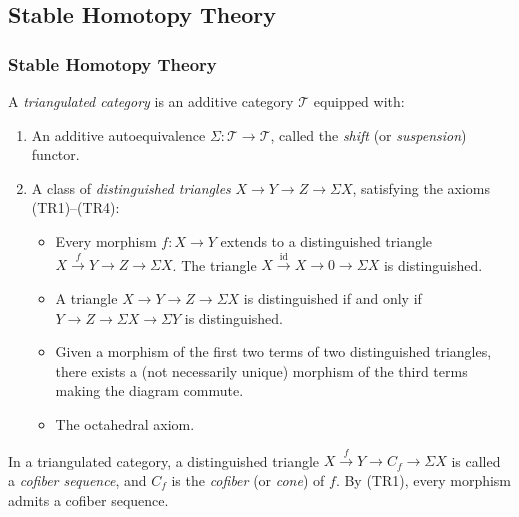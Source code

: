 \subsection{Stable Homotopy Theory}\label{sec:prereq-stable}

\subsubsection{Stable Homotopy Theory}\label{sec:prereq-stable-homotopy}

\begin{definition}\label{prereq:def:triangulated-category}
    \leanok
    A \emph{triangulated category} is an additive category $\mathcal{T}$ equipped with:
    \begin{enumerate}
        \item An additive autoequivalence $\Sigma: \mathcal{T} \to \mathcal{T}$, called the \emph{shift} (or \emph{suspension}) functor.
        \item A class of \emph{distinguished triangles} $X \to Y \to Z \to \Sigma X$, satisfying the axioms (TR1)--(TR4):
        \begin{itemize}
            \item[\textup{(TR1)}] Every morphism $f: X \to Y$ extends to a distinguished triangle $X \xrightarrow{f} Y \to Z \to \Sigma X$. The triangle $X \xrightarrow{\mathrm{id}} X \to 0 \to \Sigma X$ is distinguished.
            \item[\textup{(TR2)}] A triangle $X \to Y \to Z \to \Sigma X$ is distinguished if and only if $Y \to Z \to \Sigma X \to \Sigma Y$ is distinguished.
            \item[\textup{(TR3)}] Given a morphism of the first two terms of two distinguished triangles, there exists a (not necessarily unique) morphism of the third terms making the diagram commute.
            \item[\textup{(TR4)}] The octahedral axiom.
        \end{itemize}
    \end{enumerate}
\end{definition}

\begin{definition}\label{prereq:def:cofiber-sequence}
    \leanok
    In a triangulated category, a distinguished triangle $X \xrightarrow{f} Y \to C_f \to \Sigma X$ is called a \emph{cofiber sequence}, and $C_f$ is the \emph{cofiber} (or \emph{cone}) of $f$. By (TR1), every morphism admits a cofiber sequence.
\end{definition}

